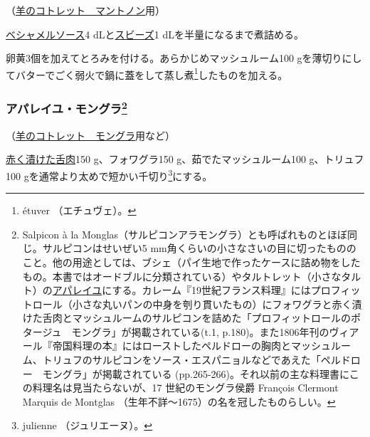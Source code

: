 \begin{recette}
（\protect\hyperlink{cotelettes-maintenon}{羊のコトレット　マントノン}用）

\protect\hyperlink{sauce-bechamel}{ベシャメルソース}4
dLと\protect\hyperlink{sauce-soubise}{スビーズ}1
dLを半量になるまで煮詰める。

卵黄3個を加えてとろみを付ける。あらかじめマッシュルーム100
gを薄切りにしてバターでごく弱火で鍋に蓋をして蒸し煮\footnote{étuver
  （エチュヴェ）。}したものを加える。

\hypertarget{appareil-montglas}{%
\subsubsection[アパレイユ・モングラ]{\texorpdfstring{アパレイユ・モングラ\footnote{Salpicon
  à la
  Monglas（サルピコンアラモングラ）とも呼ばれものとほぼ同じ。サルピコンはせいぜい5
  mm角くらいの小さなさいの目に切ったもののこと。他の用途としては、ブシェ（パイ生地で作ったケースに詰め物をしたもの。本書ではオードブルに分類されている）やタルトレット（小さなタルト）の\ul{アパレイユ}にする。カレーム『19世紀フランス料理』にはプロフィットロール（小さな丸いパンの中身を刳り貫いたもの）にフォワグラと赤く漬けた舌肉とマッシュルームのサルピコンを詰めた「プロフィットロールのポタージュ　モングラ」が掲載されている(t.1,
  p.180)。また1806年刊のヴィアール『帝国料理の本』にはローストしたペルドローの胸肉とマッシュルーム、トリュフのサルピコンをソース・エスパニョルなどであえた「ペルドロー　モングラ」が掲載されている
  (pp.265-266)。それ以前の主な料理書にこの料理名は見当たらないが、17
  世紀のモングラ侯爵 François Clermont Marquis de Montglas
  （生年不詳〜1675）の名を冠したものらしい。}}{アパレイユ・モングラ}}\label{appareil-montglas}}



（\protect\hyperlink{cotelettes-monglas}{羊のコトレット　モングラ}用など）

\protect\hyperlink{saumure-liquide-pour-langues}{赤く漬けた舌肉}150
g、フォワグラ150 g、茹でたマッシュルーム100 g、トリュフ100
gを通常より太めで短かい千切り\footnote{julienne （ジュリエーヌ）。}にする。


\end{recette}
